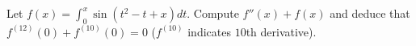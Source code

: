 Let $f(x) = \displaystyle{\int_{0}^{x} \sin(t^2 - t + x) dt}$. Compute
$f''(x) + f(x)$ and deduce that $f^{(12)}(0) + f^{(10)}(0) = 0$ ($f^{(10)}$
indicates $10$th derivative).
